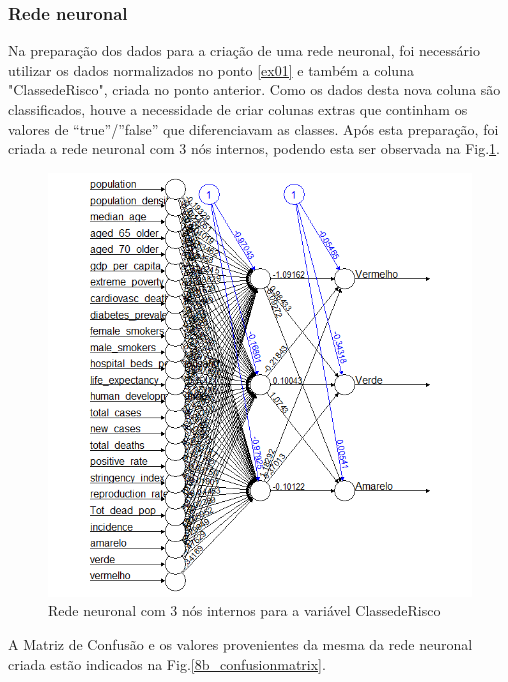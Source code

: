 \documentclass[conference]{IEEEtran}
\begin{document}
\subsubsection{Rede neuronal}
Na preparação dos dados para a criação de uma rede neuronal, foi necessário utilizar os dados normalizados no ponto \ref{ex01} e também a coluna "ClassedeRisco", criada no ponto anterior. Como os dados desta nova coluna são classificados, houve a necessidade de criar colunas extras que continham os valores de “true”/”false” que diferenciavam as classes.
Após esta preparação, foi criada a rede neuronal com 3 nós internos, podendo esta ser observada na Fig.\ref{8b_neural}.
\begin{figure}[htbp]
\centerline{\includegraphics[width=0.95\columnwidth]{images/08_3.png}}
\caption{Rede neuronal com 3 nós internos para a variável ClassedeRisco}
\label{8b_neural}
\end{figure}
A Matriz de Confusão e os valores provenientes da mesma da rede neuronal criada estão indicados na Fig.\ref{8b_confusionmatrix}.
\end{document}
